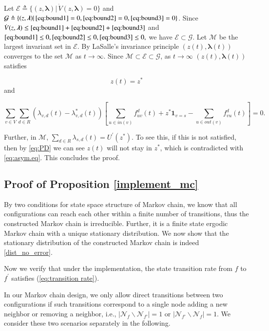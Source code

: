 \documentclass[10pt,conference]{IEEEtran}
\begin{document}
Let $\mathcal{E}\triangleq\{(z,\boldsymbol{\lambda})|\,\dot{V}(z,\boldsymbol{\lambda})=0\}$
and $\mathcal{G}\triangleq\{(z,\boldsymbol{\lambda})|\,\eqref{eq:bound1}=0,\eqref{eq:bound2}=0,\eqref{eq:bound3}=0\}$.
Since $\dot{V}(z,\boldsymbol{\lambda})\leq\eqref{eq:bound1}+\eqref{eq:bound2}+\eqref{eq:bound3}$
and $\eqref{eq:bound1}\leq0,\eqref{eq:bound2}\leq0,\eqref{eq:bound3}\leq0,$
we have $\mathcal{E}\subset\mathcal{G}$. Let $\mathcal{M}$ be the
largest invariant set in $\mathcal{E}$. By LaSalle\textquoteright{}s
invariance principle $(z(t),\boldsymbol{\lambda}(t))$ converges to
the set $\mathcal{M}$ as $t\rightarrow\infty$. Since $\mathcal{M}\subset\mathcal{E}\subset\mathcal{G}$,
as $t\rightarrow\infty$ $(z(t),\boldsymbol{\lambda}(t))$ satisfies

\begin{equation}
z(t)=z^{*}\label{eq:asym.eq}\end{equation}
and
\begin{small}
\begin{equation}
\sum_{v\in V}\sum_{d\in R}\left(\lambda_{v,d}(t)-\lambda_{v,d}^{*}(t)\right)\left[\sum_{u\in in(v)}f_{uv}^{d}(t)+z^{*}\mathbf{1}_{v=s}-\sum_{u\in out(v)}f_{vu}^{d}(t)\right]=0.\end{equation}
\end{small}
Further, in $\mathcal{M}$, $\sum_{d\in
R}\lambda_{s,d}(t)=U^{'}(z^{*})$. To see this, if this is not
satisfied, then by \eqref{eq:PD} we can see $z(t)$ will not stay in
$z^{*}$, which is contradicted with \eqref{eq:asym.eq}. This
concludes the proof.


\subsection{Proof of Proposition \ref{implement_mc}}
\label{sec:proof_mc}
By two conditions for state space structure of Markov chain, we know
that all configurations can reach each other within a finite number
of transitions, thus the constructed Markov chain is irreducible.
Further, it is a finite state ergodic Markov chain with a unique
stationary distribution. We now show that the stationary
distribution of the constructed Markov chain is indeed
\eqref{dist_no_error}.

Now we verify that under the implementation, the state transition
rate from $f$ to $f^{'}$ satisfies (\ref{eq:transition rate}).

In our Markov chain design, we only allow direct transitions between two configurations
if such transitions correspond to a single node adding a new neighbor
or removing a neighbor, i.e., $|\mathcal{N}_{f}\backslash\mathcal{N}_{f'}|=1$ or $|\mathcal{N}_{f'}\backslash\mathcal{N}_{f}|=1$. We consider these two scenarios
separately in the following.
\end{document}

